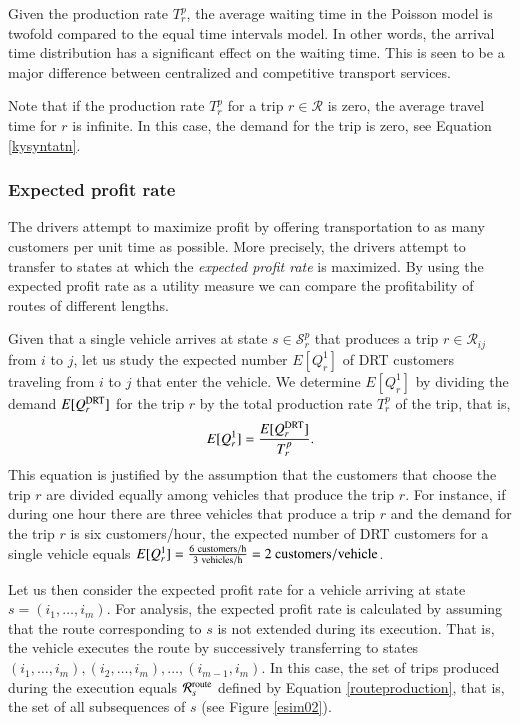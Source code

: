\documentclass[dissertation,draft*]{aaltoseries}
\begin{document}
Given the production rate $T_r^p$, the average waiting time in the Poisson model is twofold 
compared to the equal time intervals model. In other words, the arrival time distribution 
has a significant effect on the waiting time. This is seen to be a major difference between centralized and
competitive transport services. 

Note that if the production rate $T_{r}^p$ for a trip $r \in \mathcal{R}$ is zero, the
average travel time for $r$ is infinite. In this case, the demand for the trip is zero, 
see Equation \eqref{kysyntatn}. 


\subsubsection{Expected profit rate}
The drivers attempt to maximize profit by offering transportation to as many customers
per unit time as possible. More precisely, the drivers attempt to transfer to
states at which the \emph{expected profit rate} is maximized. By using the expected profit rate as a 
utility measure we can compare the profitability of routes of different lengths.

Given that a single vehicle arrives at state $s \in \mathcal{S}_{r}^p$ that 
produces a trip $r \in \mathcal{R}_{ij}$ from $i$ to $j$, 
let us study the expected number $E[Q_{r}^1]$ of DRT customers traveling 
from $i$ to $j$ that enter the vehicle.
We determine $E[Q_{r}^1]$ by
dividing the demand $E[Q_{r}^{\rm DRT}]$ for the trip $r$ by the total production rate $T_r^p$ of 
the trip, that is,
\begin{align}
E[Q_{r}^1] = \frac{E[Q_{r}^{\rm DRT}]}{ T_{r}^p}.
\end{align}
This equation is justified by the assumption that the customers
that choose the trip $r$ are divided equally among
vehicles that produce the trip $r$.
For instance, if during one hour there are three vehicles that produce a trip $r$ and the demand
for the trip $r$ is six customers/hour, the expected number of DRT customers
for a single vehicle equals $E[Q_{r}^1] = \frac{6 \ {\rm customers/h}}{3 \ {\rm vehicles/h}} = 2 \ {\rm customers/vehicle}$.


Let us then consider the expected profit rate for a vehicle 
arriving at state $s=(i_1,\ldots,i_m)$. For analysis, the expected profit rate is calculated
by assuming that the 
route corresponding to $s$ is not extended during its execution. 
That is, the vehicle executes the route by successively transferring to 
states $(i_1,\ldots,i_m),(i_2,\ldots,i_m),\ldots,(i_{m-1},i_m)$.
In this case, the    
set of trips produced during the execution equals
$\mathcal{R}_{s}^{\rm route}$ defined by Equation \eqref{routeproduction}, that is, the
set of all subsequences of $s$ (see Figure \ref{esim02}).
\end{document}
